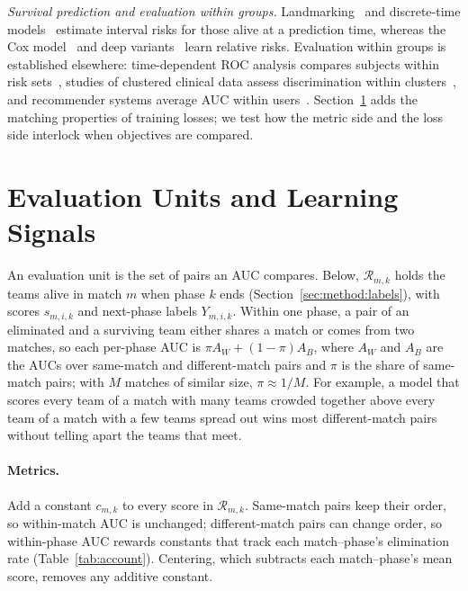 \documentclass[sigconf,anonymous]{acmart}
\begin{document}
\emph{Survival prediction and evaluation within groups.} Landmarking~\cite{vanHouwelingen07} and discrete-time models~\cite{SingerWillett93,Gensheimer19} estimate interval risks for those alive at a prediction time, whereas the Cox model~\cite{Cox72} and deep variants~\cite{DeepHit18,DynamicDeepHit20} learn relative risks. Evaluation within groups is established elsewhere: time-dependent ROC analysis compares subjects within risk sets~\cite{HeagertyZheng05}, studies of clustered clinical data assess discrimination within clusters~\cite{vanKlaveren14}, and recommender systems average AUC within users~\cite{Zhou18}. Section~\ref{sec:account} adds the matching properties of training losses; we test how the metric side and the loss side interlock when objectives are compared.

\section{Evaluation Units and Learning Signals}
\label{sec:account}
An evaluation unit is the set of pairs an AUC compares. Below, $\mathcal{R}_{m,k}$ holds the teams alive in match $m$ when phase $k$ ends (Section~\ref{sec:method:labels}), with scores $s_{m,i,k}$ and next-phase labels $Y_{m,i,k}$. Within one phase, a pair of an eliminated and a surviving team either shares a match or comes from two matches, so each per-phase AUC is $\pi A_W+(1-\pi)A_B$, where $A_W$ and $A_B$ are the AUCs over same-match and different-match pairs and $\pi$ is the share of same-match pairs; with $M$ matches of similar size, $\pi\approx1/M$. For example, a model that scores every team of a match with many teams crowded together above every team of a match with a few teams spread out wins most different-match pairs without telling apart the teams that meet.

\paragraph{Metrics.}
Add a constant $c_{m,k}$ to every score in $\mathcal{R}_{m,k}$. Same-match pairs keep their order, so within-match AUC is unchanged; different-match pairs can change order, so within-phase AUC rewards constants that track each match--phase's elimination rate (Table~\ref{tab:account}). Centering, which subtracts each match--phase's mean score, removes any additive constant.
\end{document}
